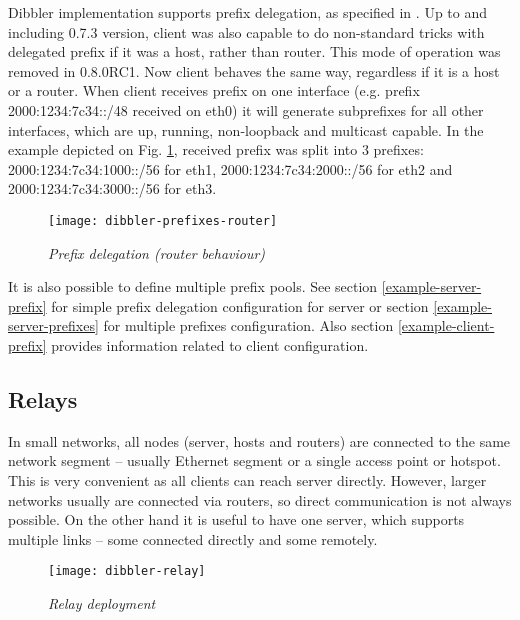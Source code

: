Dibbler implementation supports prefix delegation, as specified in
\cite{rfc3633}. Up to and including 0.7.3 version, client was also
capable to do non-standard tricks with delegated prefix if it was a
host, rather than router. This mode of operation was removed in
0.8.0RC1. Now client behaves the same way, regardless if it is a host
or a router. When client receives prefix on one interface (e.g. prefix
2000:1234:7c34::/48 received on eth0) it will generate subprefixes for
all other interfaces, which are up, running, non-loopback and
multicast capable. In the example depicted on
Fig. \ref{fig-prefixes-router}, received prefix was split into 3
prefixes: 2000:1234:7c34:1000::/56 for eth1, 2000:1234:7c34:2000::/56
for eth2 and 2000:1234:7c34:3000::/56 for eth3.

\begin{figure}[ht]
\begin{center}
\label{fig-prefixes-router}
\texttt{[image: dibbler-prefixes-router]}
\caption{\emph{Prefix delegation (router behaviour)}}
\end{center}
\end{figure}

It is also possible to define multiple prefix pools. See section
\ref{example-server-prefix} for simple prefix delegation configuration
for server or section \ref{example-server-prefixes} for multiple
prefixes configuration. Also section \ref{example-client-prefix}
provides information related to client configuration.

\subsection{Relays}
\label{feature-relays}
In small networks, all nodes (server, hosts and routers) are connected
to the same network segment -- usually Ethernet segment or a single
access point or hotspot. This is very convenient as all clients can
reach server directly. However, larger networks usually are connected
via routers, so direct communication is not always possible. On the
other hand it is useful to have one server, which supports multiple
links -- some connected directly and some remotely.

\begin{figure}[ht]
\begin{center}
\texttt{[image: dibbler-relay]}
\caption{\emph{Relay deployment}}
\end{center}
\end{figure}

